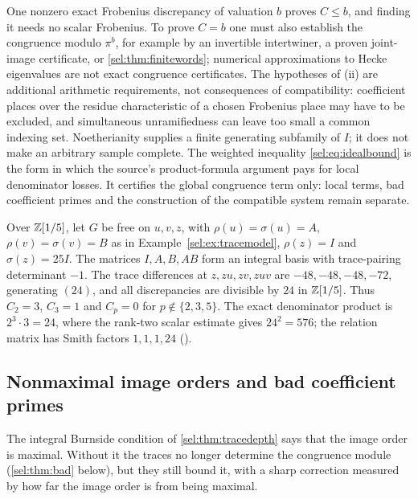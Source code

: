 One nonzero exact Frobenius discrepancy of valuation $b$ proves $C\le b$,
and finding it needs no scalar Frobenius. To prove $C=b$ one must also
establish the congruence modulo $\pi^b$, for example by an invertible
intertwiner, a proven joint-image certificate, or
\cref{sel:thm:finitewords}; numerical approximations to Hecke eigenvalues
are not exact congruence certificates. The hypotheses of (ii) are
additional arithmetic requirements, not consequences of compatibility:
coefficient places over the residue characteristic of a chosen Frobenius
place may have to be excluded, and simultaneous unramifiedness can leave too
small a common indexing set. Noetherianity supplies a finite generating
subfamily of $I$; it does not make an arbitrary sample complete. The
weighted inequality \eqref{sel:eq:idealbound} is the form in which the source's
product-formula argument pays for local denominator losses. It certifies
the global congruence term only: local terms, bad coefficient primes and the
construction of the compatible system remain separate.

\begin{example}\label{sel:ex:ideal}
Over $\mathbb{Z}[1/5]$, let $G$ be free on $u,v,z$, with
$\rho(u)=\sigma(u)=A$, $\rho(v)=\sigma(v)=B$ as in
Example~\ref{sel:ex:tracemodel}, $\rho(z)=I$ and $\sigma(z)=25I$. The matrices
$I,A,B,AB$ form an integral basis with trace-pairing determinant $-1$. The
trace differences at $z,zu,zv,zuv$ are $-48,-48,-48,-72$, generating
$(24)$, and all discrepancies are divisible by $24$ in $\mathbb{Z}[1/5]$. Thus
$C_2=3$, $C_3=1$ and $C_p=0$ for $p\notin\{2,3,5\}$. The exact denominator
product is $2^3\cdot3=24$, where the rank-two scalar estimate gives
$24^2=576$; the relation matrix has Smith factors $1,1,1,24$
().
\end{example}

\subsection{Nonmaximal image orders and bad coefficient primes}\label{sel:sec:orders}

The integral Burnside condition of \cref{sel:thm:tracedepth} says that the
image order is maximal. Without it the traces no longer determine the
congruence module (\cref{sel:thm:bad} below), but they still bound it, with
a sharp correction measured by how far the image order is from being
maximal.

